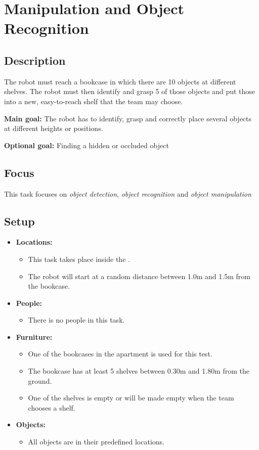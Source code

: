 \section{Manipulation and Object Recognition}
\label{test:manipulation-and-object-recognition}

\subsection*{Description}
The robot must reach a bookcase in which there are 10 objects at different shelves. The robot must then identify and grasp 5 of those objects and put those into a new, easy-to-reach shelf that the team may choose.

\noindent \textbf{Main goal:}
The robot has to identify, grasp and correctly place several objects at different heights or positions.

\noindent \textbf{Optional goal:}
Finding a hidden or occluded object

\subsection*{Focus}
This task focuses on
\textit{object detection},
\textit{object recognition} and
\textit{object manipulation}

\subsection*{Setup}
\begin{itemize}[nosep]	
	\item \textbf{Locations:} 
	\begin{itemize}
		\item This task takes place inside the \Arena{}.
		\item The robot will start at a random distance between 1.0m and 1.5m from the bookcase.
	\end{itemize}	 
	\item \textbf{People:} 
	\begin{itemize}
		\item There is no people in this task.
	\end{itemize}
	\item \textbf{Furniture:} 
	\begin{itemize}
		\item One of the bookcases in the apartment is used for this test.
		\item The bookcase has at least 5 shelves between 0.30m and 1.80m from the ground.
		\item One of the shelves is empty or will be made empty when the team chooses a shelf.
	\end{itemize}
    \item \textbf{Objects:} 
    \begin{itemize}
		\item All objects are in their predefined locations.
	\end{itemize}
\end{itemize}

